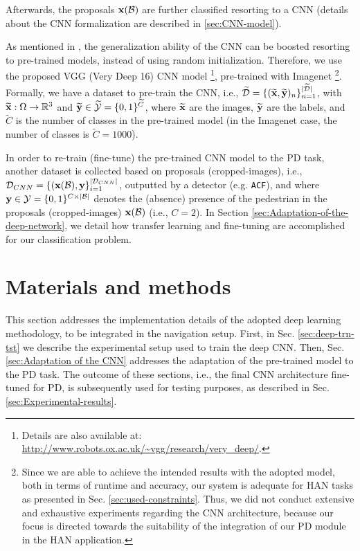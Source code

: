\documentclass[5p,time]{elsarticle}
\begin{document}
Afterwards, the proposals ${\bf x}({\cal B})$ are further classified resorting to a CNN (details about the CNN formalization are described in \ref{sec:CNN-model}).

As mentioned in \cite{YosinskiNIPS2014}, the generalization ability of the CNN can be boosted resorting to pre-trained models, instead of using random initialization.
Therefore, we use the proposed VGG (Very Deep 16) CNN model
\cite{SimonyanICLR2015}\footnote{Details are also available at: \url{http://www.robots.ox.ac.uk/~vgg/research/very_deep/}.}, pre-trained with Imagenet \cite{RussakovskyIJCV2015}
\footnote{Since we are able to achieve the intended results with the adopted model, both in terms of runtime and accuracy, our system is adequate for HAN tasks as presented in Sec. \ref{sec:used-constraints}. Thus, we did not conduct extensive and exhaustive experiments regarding the CNN architecture, because our focus is directed towards the suitability of the integration of our PD module in the HAN application.}. Formally, we have a dataset to pre-train the CNN, i.e., $\widetilde{\cal D}=\{ (\widetilde{\bf x},\widetilde{\bf y})_n \}_{n=1}^{|{\widetilde{\cal D}}|}$, with $\widetilde{\bf x}:\Omega\rightarrow\mathbb{R}^3$ and $\widetilde{\bf y}\in\widetilde{\cal Y}=\{0,1\}^{\widetilde C}$, where $\widetilde{\bf x}$ are the images, $\widetilde{\bf y}$ are the labels, and $\widetilde C$ is the number of classes in the pre-trained model (in the Imagenet case, the number of classes is $\widetilde{C}=1000$).

In order to re-train (fine-tune) the pre-trained CNN model to the PD task, another dataset is collected based on proposals (cropped-images), i.e., ${\cal D}_{CNN} =\{ ({\bf x}({\cal B}),{\bf y}\}_{i=1}^{|{\cal D}_{CNN}|}$, outputted by a detector (e.g. \texttt{ACF}), and where ${\bf y}\in{\cal Y}=\{0,1\}^{C \times |{\cal B}|}$ denotes the (absence) presence of the pedestrian in the proposals (cropped-images) ${\bf x}({\cal B})$ (i.e., $C=2$). In Section \ref{sec:Adaptation-of-the-deep-network}, we detail how transfer learning and fine-tuning are accomplished for our classification problem.

\section{Materials and methods}\label{sec:Material-and-methods}

This section addresses the implementation details of the adopted deep
learning methodology, to be integrated in the navigation
setup. First, in Sec. \ref{sec:deep-trn-tst} we describe the
experimental setup used to train the deep CNN. Then,
Sec.
\ref{sec:Adaptation of the CNN} addresses the adaptation of the
pre-trained model to the PD task. The outcome of these sections,
i.e., the final CNN architecture fine-tuned for PD, is subsequently
used for testing purposes, as described in Sec.
\ref{sec:Experimental-results}.
\end{document}
